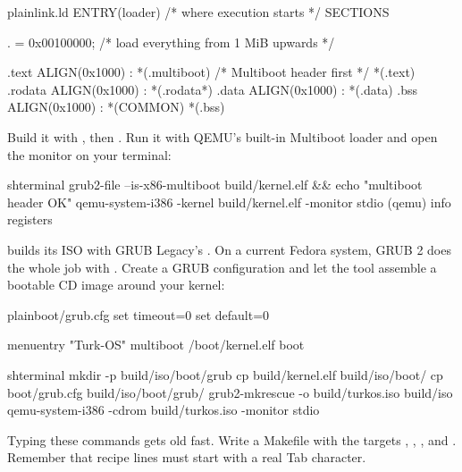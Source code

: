 \documentclass[11pt,a4paper]{article}
\begin{document}
\begin{lst}{plain}{link.ld}
ENTRY(loader)                   /* where execution starts */
SECTIONS
{
    . = 0x00100000;             /* load everything from 1 MiB upwards */

    .text ALIGN(0x1000) : {
        *(.multiboot)           /* Multiboot header first */
        *(.text)
    }
    .rodata ALIGN(0x1000) : { *(.rodata*) }
    .data   ALIGN(0x1000) : { *(.data) }
    .bss    ALIGN(0x1000) : { *(COMMON) *(.bss) }
}
\end{lst}

Build it with , then
. Run it with QEMU's built-in Multiboot loader and
open the monitor on your terminal:

\begin{lst}{sh}{terminal}
grub2-file --is-x86-multiboot build/kernel.elf && echo "multiboot header OK"
qemu-system-i386 -kernel build/kernel.elf -monitor stdio
(qemu) info registers
\end{lst}

\LOB builds its ISO with GRUB Legacy's . On a current Fedora system, GRUB 2 does the whole job
with . Create a GRUB configuration and let the tool assemble a bootable CD image around your
kernel:

\begin{lst}{plain}{boot/grub.cfg}
set timeout=0
set default=0

menuentry "Turk-OS" {
    multiboot /boot/kernel.elf
    boot
}
\end{lst}

\begin{lst}{sh}{terminal}
mkdir -p build/iso/boot/grub
cp build/kernel.elf build/iso/boot/
cp boot/grub.cfg build/iso/boot/grub/
grub2-mkrescue -o build/turkos.iso build/iso
qemu-system-i386 -cdrom build/turkos.iso -monitor stdio
\end{lst}

Typing these commands gets old fast. Write a Makefile with the targets , , ,
 and . Remember that recipe lines must start with a real Tab character.
\end{document}
